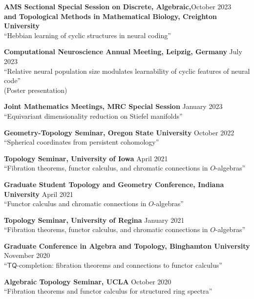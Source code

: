 \documentclass[10pt,letterpaper]{article}
\renewenvironment{itemize}{
  \begin{list}{}{
    \setlength{\leftmargin}{1.5em}
    \setlength{\itemsep}{0.25em}
    \setlength{\parskip}{0pt}
    \setlength{\parsep}{0.25em}
  }
}{
  \end{list}
}
\begin{document}
\begin{itemize}
\item {\bf AMS Sectional Special Session on Discrete, Algebraic,}\hfill October 2023 \\
{\bf and Topological Methods in Mathematical Biology, Creighton University} \\
``Hebbian learning of cyclic structures in neural coding''


\item {\bf Computational Neuroscience Annual Meeting, Leipzig, Germany} \hfill July 2023\\
``Relative neural population size modulates learnability of cyclic features of neural code''\\
(Poster presentation)

\item {\bf Joint Mathematics Meetings, MRC Special Session} \hfill January 2023\\
``Equivariant dimensionality reduction on Stiefel manifolds''


\item {\bf Geometry-Topology Seminar, Oregon State University} \hfill October 2022\\
``Spherical coordinates from persistent cohomology''



\item {\bf Topology Seminar, University of Iowa} \hfill April 2021\\
``Fibration theorems, functor calculus, and chromatic connections in $O$-algebras''


\item{\bf Graduate Student Topology and Geometry Conference, Indiana University} \hfill April 2021\\
``Functor calculus and chromatic connections in $O$-algebras''

\item {\bf Topology Seminar, University of Regina} \hfill January 2021\\
``Fibration theorems, functor calculus, and chromatic connections in $O$-algebras''

\item {\bf Graduate Conference in Algebra and Topology, Binghamton University} \hfill November 2020\\
``$\mathsf{TQ}$-completion: fibration theorems and connections to functor calculus''

\item {\bf Algebraic Topology Seminar, UCLA} \hfill October 2020\\
``Fibration theorems and functor calculus for structured ring spectra''


\end{itemize}
\end{document}
